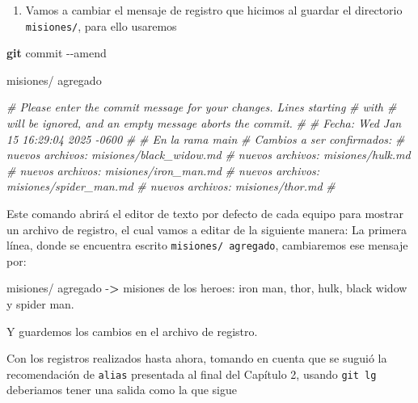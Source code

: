 \documentclass[
]{book}
\newenvironment{Shaded}{\begin{snugshade}}{\end{snugshade}}
\newcommand{\AttributeTok}[1]{\textcolor[rgb]{0.13,0.29,0.53}{#1}}
\newcommand{\CommentTok}[1]{\textcolor[rgb]{0.56,0.35,0.01}{\textit{#1}}}
\newcommand{\ExtensionTok}[1]{#1}
\newcommand{\FunctionTok}[1]{\textcolor[rgb]{0.13,0.29,0.53}{\textbf{#1}}}
\newcommand{\NormalTok}[1]{#1}
\newcommand{\OperatorTok}[1]{\textcolor[rgb]{0.81,0.36,0.00}{\textbf{#1}}}
\providecommand{\tightlist}{%
  \setlength{\itemsep}{0pt}\setlength{\parskip}{0pt}}
\begin{document}
\begin{enumerate}
\def\labelenumi{\arabic{enumi}.}
\setcounter{enumi}{2}
\tightlist
\item
  Vamos a cambiar el mensaje de registro que hicimos al guardar el directorio \texttt{misiones/}, para ello usaremos
\end{enumerate}

\begin{Shaded}
\begin{Highlighting}[]
\FunctionTok{git}\NormalTok{ commit }\AttributeTok{{-}{-}amend}
\end{Highlighting}
\end{Shaded}

\begin{Shaded}
\begin{Highlighting}[]
\ExtensionTok{misiones/}\NormalTok{ agregado}

\CommentTok{\# Please enter the commit message for your changes. Lines starting}
\CommentTok{\# with \textquotesingle{}\#\textquotesingle{} will be ignored, and an empty message aborts the commit.}
\CommentTok{\#}
\CommentTok{\# Fecha:     Wed Jan 15 16:29:04 2025 {-}0600}
\CommentTok{\#}
\CommentTok{\# En la rama main}
\CommentTok{\# Cambios a ser confirmados:}
\CommentTok{\#       nuevos archivos: misiones/black\_widow.md}
\CommentTok{\#       nuevos archivos: misiones/hulk.md}
\CommentTok{\#       nuevos archivos: misiones/iron\_man.md}
\CommentTok{\#       nuevos archivos: misiones/spider\_man.md}
\CommentTok{\#       nuevos archivos: misiones/thor.md}
\CommentTok{\#}
\end{Highlighting}
\end{Shaded}

Este comando abrirá el editor de texto por defecto de cada equipo para mostrar un archivo de registro, el cual vamos a editar de la siguiente manera:
La primera línea, donde se encuentra escrito \texttt{misiones/\ agregado}, cambiaremos ese mensaje por:

\begin{Shaded}
\begin{Highlighting}[]
\ExtensionTok{misiones/}\NormalTok{ agregado }\AttributeTok{{-}}\OperatorTok{\textgreater{}}\NormalTok{ misiones de los heroes: iron man, thor, hulk, black widow y spider man.}
\end{Highlighting}
\end{Shaded}

Y guardemos los cambios en el archivo de registro.

Con los registros realizados hasta ahora, tomando en cuenta que se suguió la recomendación de \texttt{alias} presentada al final del Capítulo 2, usando \texttt{git\ lg} deberiamos tener una salida como la que sigue
\end{document}
